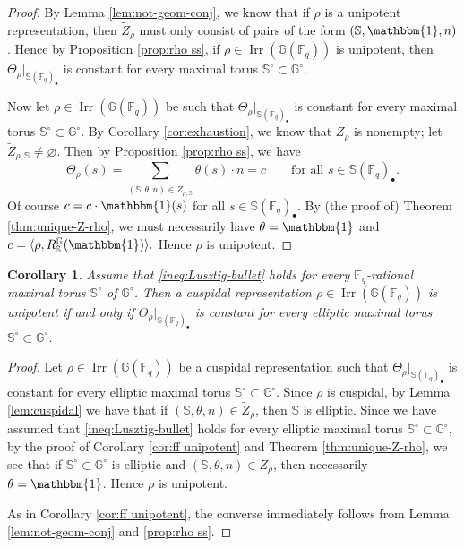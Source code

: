 \documentclass{amsart}
\newcommand{\F}{\mathbb{F}}
\newcommand{\FF}{\mathbb{F}}
\newcommand{\bbS}{\mathbb{S}}
\newcommand{\bbG}{\mathbb{G}}
\DeclareMathOperator{\Irr}{Irr}
\theoremstyle{plain}
\newtheorem{cor}[thm]{Corollary}
\theoremstyle{definition}
\theoremstyle{remark}
\theoremstyle{theorem}
\begin{document}
\begin{proof}
    By Lemma \ref{lem:not-geom-conj}, we know that if $\rho$ is a unipotent representation, then $\tilde{Z}_{\rho}$ must only consist of pairs of the form $(\bbS,\mathbbm{1},n)$. Hence by Proposition \ref{prop:rho ss}, if $\rho \in \Irr(\bbG(\FF_q))$ is unipotent, then $\Theta_\rho|_{\bbS(\FF_q)_\bullet}$ is constant for every maximal torus $\bbS^\circ \subset \bbG^\circ$.

    Now let $\rho \in \Irr(\bbG(\FF_q))$ be such that $\Theta_\rho|_{\bbS(\FF_q)_\bullet}$ is constant for every maximal torus $\bbS^\circ \subset \bbG^\circ$. By Corollary \ref{cor:exhaustion}, we know that $\tilde{Z}_{\rho}$ is nonempty; let $\tilde{Z}_{\rho,\bbS}\neq\varnothing$. Then by Proposition \ref{prop:rho ss}, we have
    \begin{equation*}
        \Theta_\rho(s) = \sum_{(\bbS,\theta,n) \in \tilde{Z}_{\rho,\bbS}} \theta(s) \cdot n= c \qquad \text{for all $s \in \bbS(\FF_q)_\bullet$}.
    \end{equation*}
    Of course $c = c \cdot \mathbbm{1}(s)$ for all $s \in \bbS(\FF_q)_\bullet$. By (the proof of) Theorem \ref{thm:unique-Z-rho}, we must necessarily have $\theta=\mathbbm{1}$ and $c = \langle \rho, R_\bbS^\bbG(\mathbbm{1}) \rangle.$ Hence $\rho$ is unipotent.
\end{proof}

\begin{cor}\label{cor:ff unipotent cuspidal}
Assume that \eqref{ineq:Lusztig-bullet} holds for every $\F_{q}$-rational maximal torus $\bbS^{\circ}$ of $\bbG^{\circ}$.
Then a cuspidal representation $\rho \in \Irr(\bbG(\FF_q))$ is unipotent if and only if $\Theta_\rho|_{\bbS(\FF_q)_\bullet}$ is constant for every elliptic maximal torus $\bbS^\circ \subset \bbG^\circ$.
\end{cor}

\begin{proof}
    Let $\rho \in \Irr(\bbG(\FF_q))$ be a cuspidal representation such that $\Theta_\rho|_{\bbS(\FF_q)_\bullet}$ is constant for every elliptic maximal torus $\bbS^\circ \subset \bbG^\circ$.  Since $\rho$ is cuspidal, by Lemma \ref{lem:cuspidal} we have that if $(\bbS,\theta,n) \in \tilde{Z}_\rho$, then $\bbS$ is elliptic. Since we have assumed that \eqref{ineq:Lusztig-bullet} holds for every elliptic maximal torus $\bbS^\circ \subset \bbG^\circ$, by the proof of Corollary \ref{cor:ff unipotent} and Theorem \ref{thm:unique-Z-rho}, we see that if $\bbS^\circ \subset \bbG^\circ$ is elliptic and $(\bbS,\theta,n) \in \tilde{Z}_\rho$, then necessarily $\theta = \mathbbm{1}$. Hence $\rho$ is unipotent.

    As in Corollary \ref{cor:ff unipotent}, the converse immediately follows from Lemma \ref{lem:not-geom-conj} and \ref{prop:rho ss}.
\end{proof}
\end{document}
